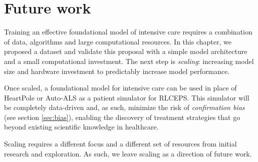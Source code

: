 \newpage
\section{Future work}

Training an effective foundational model of intensive care requires a combination of data, algorithms and large computational resources. 
In this chapter, we proposed a dataset and validate this proposal with a simple model architecture and a small computational investment.
The next step is \emph{scaling}: increasing model size and hardware investment to predictably \cite{alabdulmohsinRevisitingNeuralScaling2022,henighanScalingLawsAutoregressive2020,liMisFittingScaling2024,rosenfeldScalingLawsDeep2021} increase model performance.

Once scaled, a foundational model for intensive care can be used in place of HeartPole or Auto-ALS as a patient simulator for RLCEPS.
This simulator will be completely data-driven and, as such, minimize the risk of \emph{confirmation bias} (see section \ref{sec:bias}), enabling the discovery of treatment strategies that go beyond existing scientific knowledge in healthcare.

Scaling requires a different focus and a different set of resources from initial research and exploration.
As such, we leave scaling as a direction of future work.

